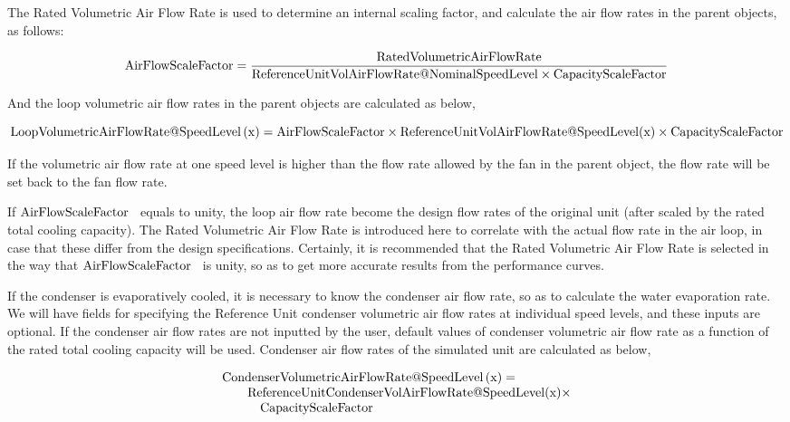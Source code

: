 The Rated Volumetric Air Flow Rate is used to determine an internal scaling factor, and calculate the air flow rates in the parent objects, as follows:

\begin{equation}
{\rm{AirFlowScaleFactor}} = \frac{{{\rm{RatedVolumetricAirFlowRate}}}}{{{\rm{ReferenceUnitVolAirFlowRate}}@{\rm{NominalSpeedLevel}} \times {\rm{CapacityScaleFactor}}}}
\end{equation}

And the loop volumetric air flow rates in the parent objects are calculated as below,

\begin{equation}
{\rm{LoopVolumetricAirFlowRate}}@{\rm{SpeedLevel}}\left( {\rm{x}} \right) = {\rm{AirFlowScaleFactor}} \times {\rm{ReferenceUnitVolAirFlowRate}}@{\rm{SpeedLevel}}({\rm{x}}) \times {\rm{CapacityScaleFactor}}
\end{equation}

If the volumetric air flow rate at one speed level is higher than the flow rate allowed by the fan in the parent object, the flow rate will be set back to the fan flow rate.

If \({\rm{AirFlowScaleFactor}}\) ~equals to unity, the loop air flow rate become the design flow rates of the original unit (after scaled by the rated total cooling capacity). The Rated Volumetric Air Flow Rate is introduced here to correlate with the actual flow rate in the air loop, in case that these differ from the design specifications. Certainly, it is recommended that the Rated Volumetric Air Flow Rate is selected in the way that \({\rm{AirFlowScaleFactor}}\) ~is unity, so as to get more accurate results from the performance curves.

If the condenser is evaporatively cooled, it is necessary to know the condenser air flow rate, so as to calculate the water evaporation rate. We will have fields for specifying the Reference Unit condenser volumetric air flow rates at individual speed levels, and these inputs are optional. If the condenser air flow rates are not inputted by the user, default values of condenser volumetric air flow rate as a function of the rated total cooling capacity will be used. Condenser air flow rates of the simulated unit are calculated as below,

\begin{equation}
  \begin{array}{l}
    \rm{CondenserVolumetricAirFlowRate} @ \rm{SpeedLevel} \left( {\rm{x}} \right) = \\
    \quad \quad \rm{ReferenceUnitCondenserVolAirFlowRate} @ \rm{SpeedLevel} (\rm{x}) \times \\
    \quad \quad \quad \rm{CapacityScaleFactor}
  \end{array}
\end{equation}

